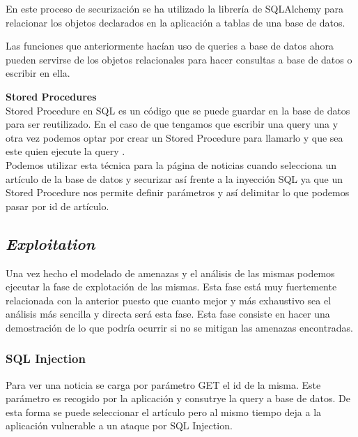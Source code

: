 \documentclass[a4paper,oneside]{article}
\begin{document}
En este proceso de securización se ha utilizado la librería de SQLAlchemy para relacionar los objetos declarados en la aplicación a tablas de una base de datos. 



Las funciones que anteriormente hacían uso de queries a base de datos ahora pueden servirse de los objetos relacionales para hacer consultas a base de datos o escribir en ella.



\textbf{Stored Procedures}\\
Stored Procedure en SQL es un código que se puede guardar en la base de datos para ser reutilizado. En el caso de que tengamos que escribir una query una y otra vez podemos optar por crear un Stored Procedure para llamarlo y que sea este quien ejecute la query \cite{w3schools}.\\
Podemos utilizar esta técnica para la página de noticias cuando selecciona un artículo de la base de datos y securizar así frente a la inyección SQL ya que un Stored Procedure nos permite definir parámetros y así delimitar lo que podemos pasar por id de artículo.\\

\subsection{\textit{Exploitation}}
Una vez hecho el modelado de amenazas y el análisis de las mismas podemos ejecutar la fase de explotación de las mismas. Esta fase está muy fuertemente relacionada con la anterior puesto que cuanto mejor y más exhaustivo sea el análisis más sencilla y directa será esta fase. Esta fase consiste en hacer una demostración de lo que podría ocurrir si no se mitigan las amenazas encontradas.\\

\subsubsection{SQL Injection}
Para ver una noticia se carga por parámetro GET el id de la misma. Este parámetro es recogido por la aplicación y consutrye la query a base de datos. De esta forma se puede seleccionar el artículo pero al mismo tiempo deja a la aplicación vulnerable a un ataque por SQL Injection.
\end{document}

